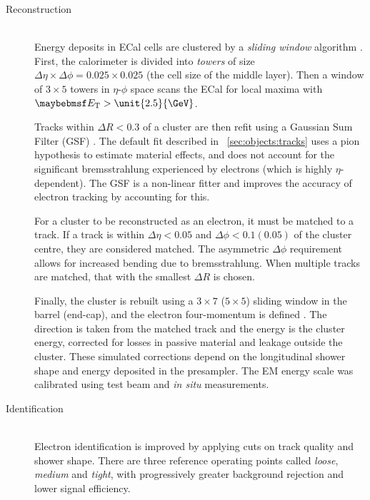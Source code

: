 \begin{description}
\item[Reconstruction] \hfill \\
	Energy deposits in \ac{ECal} cells are clustered by a \textit{sliding window} 
	algorithm \cite{ElectronPerf:Expect}. First, the calorimeter is divided into 
	\textit{towers} of size $\Delta\eta \times \Delta\phi = 0.025 \times 0.025$ (the 
	cell size of the middle layer). Then a window of $3 \times 5$ towers in $\eta$-$\phi$ 
	space scans the \ac{ECal} for local maxima with $\et > \unit{2.5}{\GeV}$.

	Tracks within $\Delta R < 0.3$ of a cluster are then refit using a Gaussian Sum 
	Filter (GSF) \cite{Electron:GSF}. The default fit described in 
	\Section~\ref{sec:objects:tracks} uses a pion hypothesis to estimate material 
	effects, and does not account for the significant bremsstrahlung experienced by 
	electrons (which is highly $\eta$-dependent). The GSF is a non-linear fitter and 
	improves the accuracy of electron tracking by accounting for this.

	For a cluster to be reconstructed as an electron, it must be matched to a track. If a 
	track is within $\Delta\eta < 0.05$ and $\Delta\phi < 0.1 (0.05)$ of the cluster 
	centre, they are considered matched. The asymmetric $\Delta\phi$ requirement allows 
	for increased bending due to bremsstrahlung. When multiple tracks are matched, that 
	with the smallest $\Delta R$ is chosen.

	Finally, the cluster is rebuilt using a $3 \times 7$ ($5 \times 5$) sliding window 
	in the barrel (end-cap), and the electron four-momentum is defined 
	\cite{ElectronPerf:2010}. The direction is taken from the matched track and the 
	energy is the cluster energy, corrected for losses in passive material and leakage 
	outside the cluster. These simulated corrections depend on the longitudinal shower 
	shape and energy deposited in the presampler. The EM energy scale was calibrated
	using test beam and \textit{in situ} \HepProcess{\PZ \HepTo \Pe\Pe} measurements.

\item[Identification] \hfill \\
	Electron identification is improved by applying cuts on track quality and shower 
	shape. There are three reference operating points called \textit{loose}, 
	\textit{medium} and \textit{tight}, with progressively greater background rejection 
	and lower signal efficiency.
	

\end{description}
